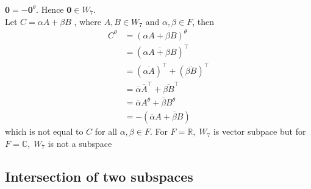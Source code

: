 \documentclass[a4paper, titlepage]{article}
\begin{document}
\begin{enumerate}[label=\textbf{\arabic*.}]
    $\textbf{0} = -\textbf{0}^\theta$. Hence $\textbf{0} \in W_7$. \hfill \\
    Let 
    $C = \alpha A + \beta B$
    , where $A, B \in W_7$ and $\alpha, \beta \in F$, then 
    \begin{align*}
        C^\theta &= (\alpha A + \beta B)^\theta \\
                 &= (\overline{\alpha A + \beta B})^\top \\
                 &= (\overline{\alpha A})^\intercal + (\overline{\beta B})^\intercal \\
                 &= \overline{\alpha} \overline{A}^\intercal + \overline{\beta B}^\intercal \\
                 &= \overline{\alpha} A^\theta + \overline{\beta} B^\theta \\
                 &= - (\overline{\alpha} A + \overline{\beta} B)
    \end{align*}
    which is not equal to $C$ for all $\alpha, \beta \in F$. 
    For $F = \mathbb{R}, \; W_7$ is vector subpace but for 
    $F = \mathbb{C}, \; W_7$ is not a subspace
\end{enumerate}


\begin{center}
    \date{$10^{\text{th}}$ September 2021}
\end{center}

\subsection{Intersection of two subspaces}
\end{document}
